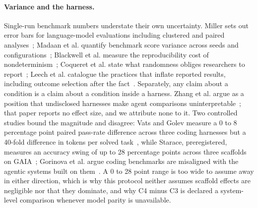 \paragraph{Variance and the harness.}
Single-run benchmark numbers understate their own uncertainty. Miller sets out
error bars for language-model evaluations including clustered and paired
analyses~\cite{arxiv-2411-00640}; Madaan et al. quantify benchmark score variance
across seeds and configurations~\cite{arxiv-2406-10229}; Blackwell et al. measure
the reproducibility cost of nondeterminism~\cite{arxiv-2410-03492}; Coqueret et
al. state what randomness obliges researchers to report~\cite{arxiv-2607-24372};
Leech et al. catalogue the practices that inflate reported results, including
outcome selection after the fact~\cite{arxiv-2407-12220}. Separately, any claim
about a condition is a claim about a condition inside a harness. Zhang et al.
argue as a position that undisclosed harnesses make agent comparisons
uninterpretable~\cite{arxiv-2605-23950}; that paper reports no effect size, and
we attribute none to it. Two controlled studies bound the magnitude and disagree:
Vats and Golev measure a 0 to 8 percentage point paired pass-rate difference
across three coding harnesses but a 40-fold difference in tokens per solved
task~\cite{arxiv-2607-22585}, while Starace, preregistered, measures an accuracy
swing of up to 28 percentage points across three scaffolds on
GAIA~\cite{arxiv-2606-08529}; Gorinova et al. argue coding benchmarks are
misaligned with the agentic systems built on them~\cite{arxiv-2606-17799}. A 0 to
28 point range is too wide to assume away in either direction, which is why this
protocol neither assumes scaffold effects are negligible nor that they dominate,
and why C4 minus C3 is declared a system-level comparison whenever model parity
is unavailable.
